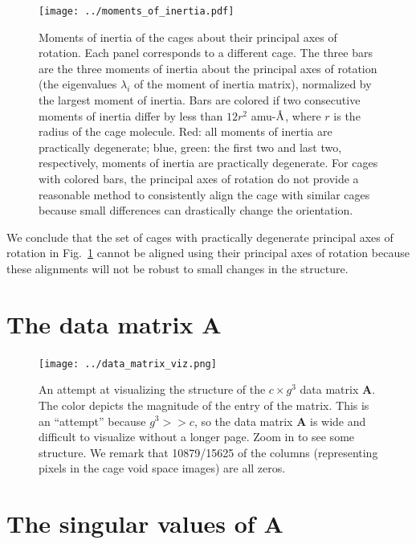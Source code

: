 \documentclass[journal=jacsat,manuscript=article]{achemso}
\newcommand{\angstrom}{\mbox{\normalfont\AA}}
\begin{document}
{\begin{figure}
\centering
\texttt{[image: ../moments\_of\_inertia.pdf]}
	\caption{{\color{red} Moments of inertia of the cages about their principal axes of rotation. Each panel corresponds to a different cage. The three bars are the three moments of inertia about the principal axes of rotation (the eigenvalues $\lambda_i$ of the moment of inertia matrix), normalized by the largest moment of inertia. Bars are colored if two consecutive moments of inertia differ by less than $12 r^2$ amu-$\angstrom$, where $r$ is the radius of the cage molecule. Red: all moments of inertia are practically degenerate; blue, green: the first two and last two, respectively, moments of inertia are practically degenerate. For cages with colored bars, the principal axes of rotation do not provide a reasonable method to consistently align the cage with similar cages because small differences can drastically change the orientation.
	}%
	} \label{fig:moments_of_inertia}
\end{figure}

We conclude that the set of cages with practically degenerate principal axes of rotation in Fig.~\ref{fig:moments_of_inertia} cannot be aligned using their principal axes of rotation because these alignments will not be robust to small changes in the structure.


} %

\newpage

\section{The data matrix $\mathbf{A}$}

\begin{figure}
\centering
	\texttt{[image: ../data\_matrix\_viz.png]}
	\caption{An attempt at visualizing the structure of the $c \times g^3$ data matrix $\mathbf{A}$. The color depicts the magnitude of the entry of the matrix. This is an ``attempt'' because $g^3>>c$, so the data matrix $\mathbf{A}$ is wide and difficult to visualize without a longer page. Zoom in to see some structure. We remark that 10879/15625 of the columns (representing pixels in the cage void space images) are all zeros.
	} \label{fig:data_matrix}
\end{figure}

\newpage
\clearpage

\section{The singular values of $\mathbf{A}$}
\end{document}
